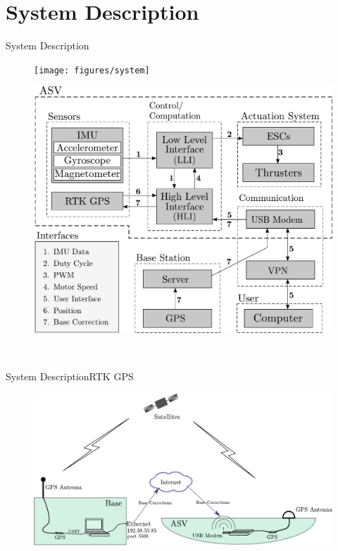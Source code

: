 \section{System Description}
\begin{frame}{System Description}{}
    \begin{minipage}{0.45\linewidth}
    \begin{figure}[H]
        \centering
        \texttt{[image: figures/system]}
    \end{figure}        
    \end{minipage}\hfill      
    \begin{minipage}{0.45\linewidth}
    \begin{figure}[H]
        \centering
        \includegraphics[width=1\linewidth]{figures/systemDiagram5}
    \end{figure}                
    \end{minipage}\hfill \\
\end{frame}

\begin{frame}{System Description}{RTK GPS}
    \begin{figure}[H]
        \centering
        \includegraphics[width=0.7\linewidth]{figures/comunicationSetup}
    \end{figure}        

\end{frame}

